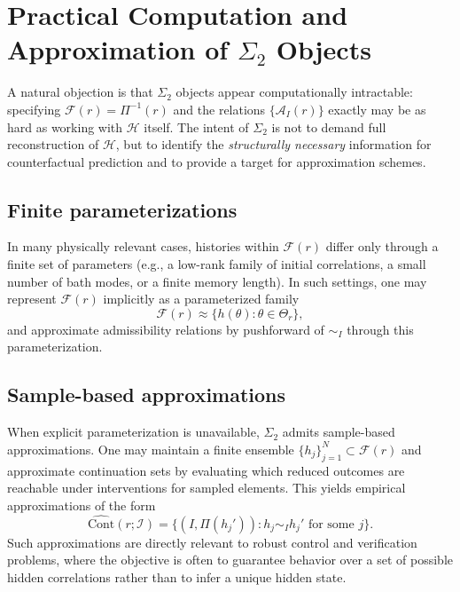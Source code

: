 \section{Practical Computation and Approximation of \texorpdfstring{$\Sigma_2$}{Sigma-2} Objects}
\label{sec:sigma2-practical}

A natural objection is that $\Sigma_2$ objects appear computationally intractable: specifying
$\mathcal{F}(r)=\Pi^{-1}(r)$ and the relations $\{\mathcal{A}_I(r)\}$ exactly may be as hard as
working with $\mathcal{H}$ itself. The intent of $\Sigma_2$ is not to demand full reconstruction of
$\mathcal{H}$, but to identify the \emph{structurally necessary} information for counterfactual
prediction and to provide a target for approximation schemes.

\subsection{Finite parameterizations}

In many physically relevant cases, histories within $\mathcal{F}(r)$ differ only through a
finite set of parameters (e.g., a low-rank family of initial correlations, a small number of
bath modes, or a finite memory length). In such settings, one may represent $\mathcal{F}(r)$
implicitly as a parameterized family
\begin{equation}
\mathcal{F}(r) \approx \{ h(\theta) : \theta \in \Theta_r \},
\end{equation}
and approximate admissibility relations by pushforward of $\sim_I$ through this parameterization.

\subsection{Sample-based approximations}

When explicit parameterization is unavailable, $\Sigma_2$ admits sample-based approximations. One may
maintain a finite ensemble $\{h_j\}_{j=1}^N \subset \mathcal{F}(r)$ and approximate continuation
sets by evaluating which reduced outcomes are reachable under interventions for sampled elements.
This yields empirical approximations of the form
\begin{equation}
\widehat{\mathrm{Cont}}(r;\mathcal{I})
=
\{(I,\Pi(h_j')) : h_j \sim_I h_j' \text{ for some } j \}.
\end{equation}
Such approximations are directly relevant to robust control and verification problems, where the
objective is often to guarantee behavior over a set of possible hidden correlations rather than
to infer a unique hidden state.

